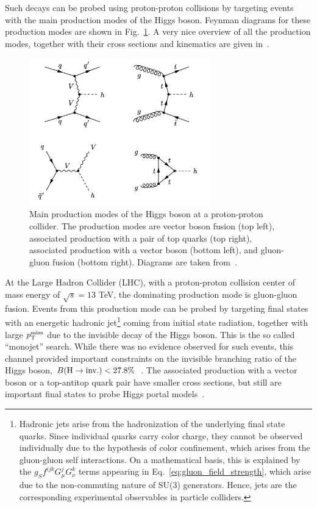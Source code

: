 Such decays can be probed using proton-proton collisions by targeting events with the main production modes of the Higgs boson. Feynman diagrams for these production 
modes are shown in Fig.~\ref{fig:all_higgs_prod}. A very nice overview of all the production modes, 
together with their cross sections and kinematics are given in~\cite{Djouadi:2005gi}.

\begin{figure}
    \centering
    \includegraphics[width=0.7\textwidth]{all_higgs_prod.png}    
    \caption{Main production modes of the Higgs boson at a proton-proton collider. The production modes are vector boson fusion (top left), associated production with
    a pair of top quarks (top right), associated production with a vector boson (bottom left), and gluon-gluon fusion (bottom right). Diagrams are taken from~\cite{Argyropoulos:2021sav}.}
    \label{fig:all_higgs_prod}
\end{figure}

At the Large Hadron Collider (LHC), with a proton-proton collision center of mass energy of $\sqrt{s} = 13$ TeV, the dominating production mode is gluon-gluon fusion. Events from 
this production mode can be probed by targeting final states with an energetic hadronic jet\footnote{Hadronic jets arise from the hadronization of the
underlying final state quarks. Since individual quarks carry color charge, they cannot be observed individually due to the hypothesis of color confinement,
which arises from the gluon-gluon self interactions. On a mathematical basis, this is explained by the $g_{S} f^{ijk} G_{\mu}^{j} G_{\nu}^{k}$ terms appearing in 
Eq.~\ref{eq:gluon_field_strength}, which arise due to the non-commuting nature of SU(3) generators. Hence, jets are the corresponding 
experimental observables in particle colliders.} 
coming from initial state radiation, together with large $p_{\textrm{T}}^{\textrm{miss}}$ due to the invisible decay
of the Higgs boson. This is the so called ``monojet'' search. While there was no evidence observed for such events, this channel provided important constraints on the invisible
branching ratio of the Higgs boson, $B(\textrm{H} \rightarrow \textrm{inv.}) < 27.8\%$~\cite{CMS:2021far}. The associated production with a vector boson or a top-antitop quark pair have smaller cross sections,
but still are important final states to probe Higgs portal models~\cite{CMS:2023sdw}.

